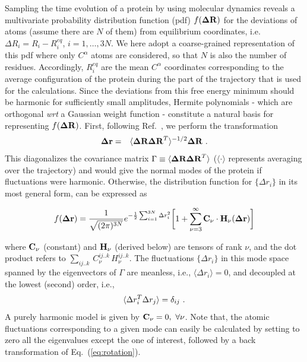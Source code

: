 \documentclass[12pt]{iopart}
\begin{document}
Sampling the time evolution of a protein by using molecular dynamics
reveals a multivariate probability distribution function (pdf) $f({\bf\Delta
R})$ for the deviations of atoms (assume there are $N$ of them) from
equilibrium coordinates, i.e. $\Delta R_i = R_i - R_i^{eq}$,
$i=1,\dots,3N$. We here adopt a coarse-grained representation of this
pdf where only $C^\alpha$ atoms are considered, so that $N$ is also the
number of residues. Accordingly, $R_i^{eq}$ are the mean $C^\alpha$
coordinates corresponding to the average configuration of the protein during
the part of the trajectory that is used for the calculations. Since
the deviations from this free energy minimum should be harmonic for
sufficiently small amplitudes, Hermite polynomials - which are
orthogonal {\it wrt} a Gaussian weight function - constitute a natural
basis for representing $f({\bf\Delta R})$. First, following
Ref.~\cite{garcia1992large,yogurtcu2009statistical}, we perform the
transformation
\begin{eqnarray}
\label{eq:rotation}
{\bf \Delta r} &=& \langle {\bf\Delta R \Delta R}^T\rangle ^{-1/2} {\bf
  \Delta R}\ .
\end{eqnarray}
This diagonalizes the covariance matrix $ \Gamma\equiv\langle
{\bf\Delta R \Delta R}^T\rangle$ ($\langle \cdot\rangle$
represents averaging over the trajectory) and would give the normal
modes of the protein if fluctuations were harmonic. Otherwise, the
distribution function for $\{\Delta r_i\}$ in its most general form, can
be expressed as~\cite{flory1974moments}
\begin{small}
\begin{equation}
\label{hermite_expansion}
f({\bf\Delta r}) = \frac{1}{\sqrt{(2\pi)^{3N}}} e^{
    -\frac{1}{2}\sum_{i=1}^{3N} \Delta r_i^2} \bigg[ 1 +  \sum_{\nu=3}^\infty
 {\bf C_\nu}\cdot {\bf H}_\nu({\bf \Delta r}) \bigg]
\end{equation}
\end{small}

\noindent where ${\bf C}_\nu$ (constant) and ${\bf H}_\nu$ (derived
below) are tensors of rank $\nu$, and the dot product refers to
$\sum_{ij..k}\,C_\nu^{ij..k}\,H_\nu^{ij..k}$.  The fluctuations
$\{\Delta r_i\}$ in this mode space spanned by the eigenvectors of
$\Gamma$ are meanless, i.e., $\langle {\Delta r_i}\rangle = 0$, and
decoupled at the lowest (second) order, i.e.,
\begin{equation}
\langle {
\label{eqn:pair_corr}
  \Delta r_i^T \Delta r_j}\rangle = \delta_{ij}\ .
\end{equation}
A purely harmonic model is given by ${\bf C}_\nu = 0,\ \forall
\nu$. Note that, the atomic fluctuations
corresponding to a given mode can easily be calculated by setting to
zero all the eigenvalues except the one of interest, followed by a
back transformation of Eq.~(\ref{eq:rotation}).
\end{document}
